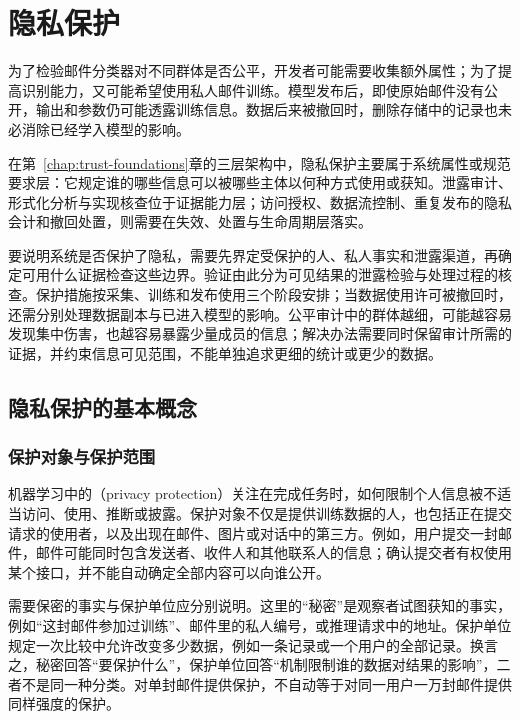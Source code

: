 \chapter{隐私保护}
\label{chap:trust-privacy}

为了检验邮件分类器对不同群体是否公平，开发者可能需要收集额外属性；为了提高识别能力，又可能希望使用私人邮件训练。模型发布后，即使原始邮件没有公开，输出和参数仍可能透露训练信息。数据后来被撤回时，删除存储中的记录也未必消除已经学入模型的影响。

在第~\ref{chap:trust-foundations}章的三层架构中，隐私保护主要属于系统属性或规范要求层：它规定谁的哪些信息可以被哪些主体以何种方式使用或获知。泄露审计、形式化分析与实现核查位于证据能力层；访问授权、数据流控制、重复发布的隐私会计和撤回处置，则需要在失效、处置与生命周期层落实。

要说明系统是否保护了隐私，需要先界定受保护的人、私人事实和泄露渠道，再确定可用什么证据检查这些边界。验证由此分为可见结果的泄露检验与处理过程的核查。保护措施按采集、训练和发布使用三个阶段安排；当数据使用许可被撤回时，还需分别处理数据副本与已进入模型的影响。公平审计中的群体越细，可能越容易发现集中伤害，也越容易暴露少量成员的信息；解决办法需要同时保留审计所需的证据，并约束信息可见范围，不能单独追求更细的统计或更少的数据。

\section{隐私保护的基本概念}
\label{sec:privacy-concepts}

\subsection{保护对象与保护范围}
\label{sec:privacy-subjects}

机器学习中的（privacy protection）关注在完成任务时，如何限制个人信息被不适当访问、使用、推断或披露。保护对象不仅是提供训练数据的人，也包括正在提交请求的使用者，以及出现在邮件、图片或对话中的第三方。例如，用户提交一封邮件，邮件可能同时包含发送者、收件人和其他联系人的信息；确认提交者有权使用某个接口，并不能自动确定全部内容可以向谁公开。

需要保密的事实与保护单位应分别说明。这里的“秘密”是观察者试图获知的事实，例如“这封邮件参加过训练”、邮件里的私人编号，或推理请求中的地址。保护单位规定一次比较中允许改变多少数据，例如一条记录或一个用户的全部记录。换言之，秘密回答“要保护什么”，保护单位回答“机制限制谁的数据对结果的影响”，二者不是同一种分类。对单封邮件提供保护，不自动等于对同一用户一万封邮件提供同样强度的保护。

